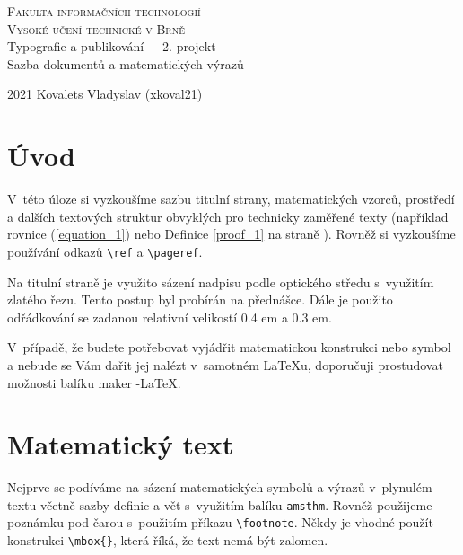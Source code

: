 \documentclass[a4paper, 11pt, twocolumn]{article}
\begin{document}
\begin{titlepage}
\begin{center}

\Huge \textsc{Fakulta informačních technologií\\
Vysoké učení technické v Brně} \\
\LARGE Typografie a publikování \,--\, 2. projekt \\
Sazba dokumentů a matematických výrazů \\

\end{center}

{\Large 2021 \hfill
Kovalets Vladyslav (xkoval21)}

\end{titlepage}

\newpage

\section*{Úvod}

V~této úloze si vyzkoušíme sazbu titulní strany, matematic\-kých vzorců, prostředí a dalších textových struktur obvyklých pro technicky zaměřené texty (například rovnice (\ref{equation_1})
nebo Definice \ref{proof_1} na straně \pageref{proof_1}). Rovněž si vyzkoušíme pou\-žívání odkazů \verb|\ref| a \verb|\pageref|.

Na titulní straně je využito sázení nadpisu podle optického středu s~využitím zlatého řezu. Tento postup byl
probírán na přednášce. Dále je použito odřádkování se
zadanou relativní velikostí 0.4 em a 0.3 em.

V~případě, že budete potřebovat vyjádřit matematickou
konstrukci nebo symbol a nebude se Vám dařit jej nalézt
v~samotném \LaTeX u, doporučuji prostudovat možnosti
balíku maker \AmS-\LaTeX.

\section{Matematický text}

Nejprve se podíváme na sázení matematických symbolů
a výrazů v~plynulém textu včetně sazby definic a vět s~využitím balíku \verb|amsthm|. Rovněž použijeme poznámku pod
čarou s~použitím příkazu \verb|\footnote|. Někdy je vhodné
použít konstrukci \verb|\mbox{}|, která říká, že text nemá být
zalomen.
\end{document}
